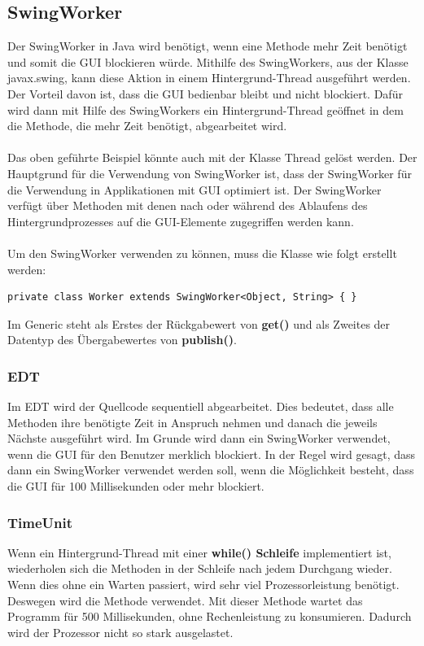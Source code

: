 \subsection{SwingWorker}
Der SwingWorker in Java wird benötigt, wenn eine Methode mehr Zeit benötigt und somit die \ac{GUI} blockieren würde. Mithilfe des SwingWorkers, aus der Klasse javax.swing, kann diese Aktion in einem Hintergrund-Thread ausgeführt werden. Der Vorteil davon ist, dass die \ac{GUI} bedienbar bleibt und nicht blockiert. Dafür wird dann mit Hilfe des SwingWorkers ein Hintergrund-Thread geöffnet in dem die Methode, die mehr Zeit benötigt, abgearbeitet wird.
\\ \\
Das oben geführte Beispiel könnte auch mit der Klasse Thread gelöst werden. Der Hauptgrund für die Verwendung von SwingWorker ist, dass der SwingWorker für die Verwendung in Applikationen mit \ac{GUI} optimiert ist. Der SwingWorker verfügt über Methoden mit denen nach oder während des Ablaufens des Hintergrundprozesses auf die \ac{GUI}-Elemente zugegriffen werden kann.
\\ \\ 
Um den SwingWorker verwenden zu können, muss die Klasse wie folgt erstellt werden:
\begin{lstlisting}[style=JavaStyle, caption=SwingWorker Klasse erstellen]
	private class Worker extends SwingWorker<Object, String> { } 
\end{lstlisting}
Im Generic steht als Erstes der Rückgabewert von \textbf{get()} und als Zweites der Datentyp des Übergabewertes von \textbf{publish()}.

\newpage

\subsubsection{EDT}
Im \ac{EDT} wird der Quellcode sequentiell abgearbeitet. Dies bedeutet, dass alle Methoden ihre benötigte Zeit in Anspruch nehmen und danach die jeweils Nächste ausgeführt wird. Im Grunde wird dann ein SwingWorker verwendet, wenn die \ac{GUI} für den Benutzer merklich blockiert. In der Regel wird gesagt, dass dann ein SwingWorker verwendet werden soll, wenn die Möglichkeit besteht, dass die \ac{GUI} für 100 Millisekunden oder mehr blockiert.

\subsubsection{TimeUnit}
Wenn ein Hintergrund-Thread mit einer \textbf{while() Schleife} implementiert ist, wiederholen sich die Methoden in der Schleife nach jedem Durchgang wieder. Wenn dies ohne ein Warten passiert, wird sehr viel Prozessorleistung benötigt. \\ Deswegen wird die Methode  verwendet. Mit dieser Methode wartet das Programm für 500 Millisekunden, ohne Rechenleistung zu konsumieren. Dadurch wird der Prozessor nicht so stark ausgelastet. 

